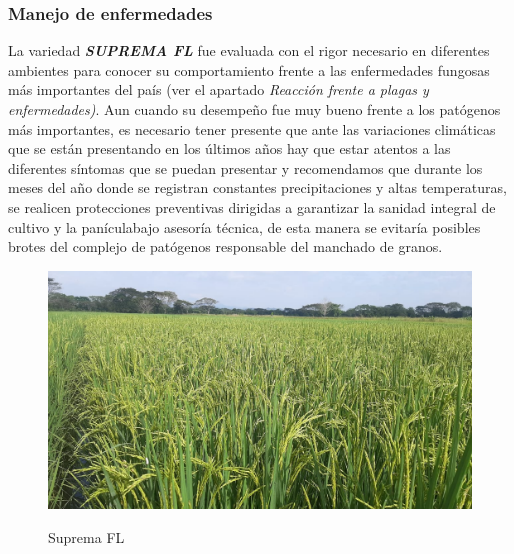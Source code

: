 \documentclass[
  letterpaper,
  DIV=11,
  numbers=noendperiod]{scrartcl}
\begin{document}
\subsubsection{\texorpdfstring{\textbf{Manejo de
enfermedades}}{Manejo de enfermedades}}\label{manejo-de-enfermedades}

La variedad \textbf{\emph{SUPREMA FL}} fue evaluada con el rigor
necesario en diferentes ambientes para conocer su comportamiento frente
a las enfermedades fungosas más importantes del país (ver el apartado
\emph{Reacción frente a plagas y enfermedades)}. Aun cuando su desempeño
fue muy bueno frente a los patógenos más importantes, es necesario tener
presente que ante las variaciones climáticas que se están presentando en
los últimos años hay que estar atentos a las diferentes síntomas que se
puedan presentar y recomendamos que durante los meses del año donde se
registran constantes precipitaciones y altas temperaturas, se realicen
protecciones preventivas dirigidas a garantizar la sanidad integral de
cultivo y la panículabajo asesoría técnica, de esta manera se evitaría
posibles brotes del complejo de patógenos responsable del manchado de
granos.

\begin{figure}

\begin{minipage}{0.50\linewidth}

\includegraphics{AP009-9.jpeg}

\end{minipage}%
%
\begin{minipage}{0.50\linewidth}
Suprema FL\end{minipage}%

\end{figure}%
\end{document}

